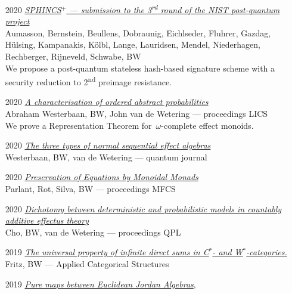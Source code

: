 \documentclass{article}
\newcommand\partitle[1]{\vskip20pt\par\noindent{\textsf{\textbf{#1}}}}
\begin{document}
\partitle{Publications}
\begin{itemize}
    \item[2020] \emph{\href{https://sphincs.org/data/sphincs+-round3-specification.pdf}{SPHINCS$^+$ ---
        submission to the 3\textsuperscript{rd} round of the NIST post-quantum project}}\\
    {\footnotesize Aumasson, Bernstein, Beullens, Dobraunig, Eichlseder, Fluhrer,
        Gazdag, H\"ulsing, Kampanakis, K\"olbl, Lange, Lauridsen, Mendel,
        Niederhagen, Rechberger, Rijneveld, Schwabe, BW}\\
    We propose a post-quantum stateless hash-based signature scheme
            with a security reduction to 2\textsuperscript{nd} preimage resistance.
    \item[2020] \emph{\href{https://dl.acm.org/doi/abs/10.1145/3373718.3394742}{A characterisation of ordered abstract probabilities}}\\
    {\footnotesize Abraham Westerbaan, BW, John van de Wetering
            --- proceedings LICS}\\
        We prove a Representation Theorem for~$\omega$-complete
        effect monoids.
    \item[2020] \emph{\href{https://quantum-journal.org/papers/q-2020-12-24-378/}{The three types of normal
            sequential effect algebras}}\\{\footnotesize
            Westerbaan, BW, van de Wetering --- quantum journal}
    \item[2020] \emph{\href{https://drops.dagstuhl.de/opus/volltexte/2020/12746/}{Preservation of Equations by Monoidal Monads}}\\{\footnotesize
        Parlant, Rot, Silva, BW --- proceedings MFCS}
    \item[2020] \emph{\href{https://arxiv.org/abs/2003.10245}{Dichotomy between deterministic and probabilistic models in countably additive effectus theory}}\\{\footnotesize
        Cho, BW, van de Wetering --- proceedings QPL}
    \item[2019] \emph{\href{https://link.springer.com/article/10.1007/s10485-019-09583-9}{The
        universal property of infinite direct sums in C$^*$- and
        W$^*$-categories.}}\\{\footnotesize
        Fritz, BW ---  Applied Categorical Structures}
    \item[2019] \emph{\href{https://arxiv.org/abs/1805.11496}{Pure maps between Euclidean Jordan Algebras}}, \\{\footnotesize
}
\end{itemize}
\end{document}
